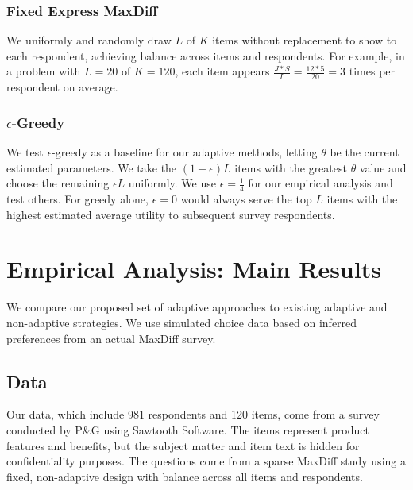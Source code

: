 \documentclass[nonblindrev]{informs3}
\newcommand{\numperset}{L}
\begin{document}


\subsubsection{Fixed Express MaxDiff}
We uniformly and randomly draw $\numperset$ of $K$ items without replacement to show to each respondent, achieving balance across items and respondents. For example, in a problem with $\numperset=20$ of $K=120$, each item appears $\frac{J*S}{L} = \frac{12*5}{20} = 3$ times per respondent on average.

\subsubsection{$\epsilon$-Greedy}
We test $\epsilon$-greedy as a baseline for our adaptive methods, letting $\theta$ be the current estimated parameters. We take the $(1-\epsilon)L$ items with the greatest $\theta$ value and choose the remaining $\epsilon L$ uniformly. We use $\epsilon=\frac{1}{4}$ for our empirical analysis and test others. For greedy alone, $\epsilon=0$ would always serve the top $\numperset$ items with the highest estimated average utility to subsequent survey respondents.

\section{Empirical Analysis: Main Results}

\label{sec:empirical_main}
We compare our proposed set of adaptive approaches to existing adaptive and non-adaptive strategies. We use simulated choice data based on inferred preferences from an actual MaxDiff survey.

\subsection{Data}
Our data, which include 981 respondents and 120 items, come from a survey conducted by P\&G using Sawtooth Software. The items represent product features and benefits, but the subject matter and item text is hidden for confidentiality purposes. The questions come from a sparse MaxDiff study using a fixed, non-adaptive design with balance across all items and respondents. 
\end{document}
